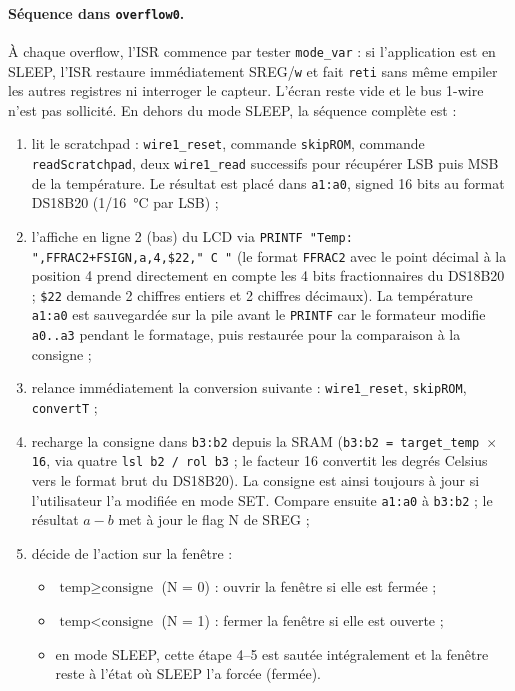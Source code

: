 \documentclass[11pt]{article}
\begin{document}
\paragraph{Séquence dans \texttt{overflow0}.} À chaque overflow, l'ISR commence par tester \texttt{mode\_var} : si l'application est en SLEEP, l'ISR restaure immédiatement SREG/\texttt{w} et fait \texttt{reti} sans même empiler les autres registres ni interroger le capteur. L'écran reste vide et le bus 1-wire n'est pas sollicité. En dehors du mode SLEEP, la séquence complète est :

\begin{enumerate}
  \item lit le scratchpad : \texttt{wire1\_reset}, commande \texttt{skipROM}, commande \texttt{readScratchpad}, deux \texttt{wire1\_read} successifs pour récupérer LSB puis MSB de la température. Le résultat est placé dans \texttt{a1:a0}, signed 16 bits au format DS18B20 (1/16~°C par LSB) ;
  \item l'affiche en ligne 2 (bas) du LCD via \texttt{PRINTF "Temp: ",FFRAC2+FSIGN,a,4,\$22," C "} (le format \texttt{FFRAC2} avec le point décimal à la position 4 prend directement en compte les 4 bits fractionnaires du DS18B20 ; \texttt{\$22} demande 2 chiffres entiers et 2 chiffres décimaux). La température \texttt{a1:a0} est sauvegardée sur la pile avant le \texttt{PRINTF} car le formateur modifie \texttt{a0..a3} pendant le formatage, puis restaurée pour la comparaison à la consigne ;
  \item relance immédiatement la conversion suivante : \texttt{wire1\_reset}, \texttt{skipROM}, \texttt{convertT} ;
  \item recharge la consigne dans \texttt{b3:b2} depuis la SRAM (\texttt{b3:b2 = target\_temp $\times$ 16}, via quatre \texttt{lsl b2 / rol b3} ; le facteur 16 convertit les degrés Celsius vers le format brut du DS18B20). La consigne est ainsi toujours à jour si l'utilisateur l'a modifiée en mode SET. Compare ensuite \texttt{a1:a0} à \texttt{b3:b2} ; le résultat $a - b$ met à jour le flag N de SREG ;
  \item décide de l'action sur la fenêtre :
    \begin{itemize}
      \item $\text{temp} \geq \text{consigne}$ (N = 0) : ouvrir la fenêtre si elle est fermée ;
      \item $\text{temp} < \text{consigne}$ (N = 1) : fermer la fenêtre si elle est ouverte ;
      \item en mode SLEEP, cette étape 4--5 est sautée intégralement et la fenêtre reste à l'état où SLEEP l'a forcée (fermée).
    \end{itemize}
\end{enumerate}
\end{document}
